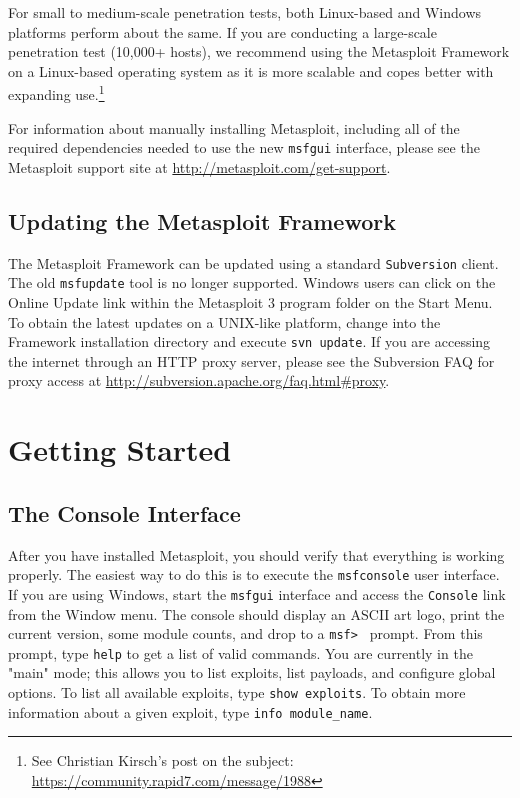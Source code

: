 \documentclass{report}
\begin{document}
\par
For small to medium-scale penetration tests, both Linux-based and Windows
platforms perform about the same. If you are conducting a large-scale
penetration test (10,000+ hosts), we recommend using the Metasploit Framework
on a Linux-based operating system as it is more scalable and copes better with
expanding use.\footnote{See Christian Kirsch's post on the subject:
\url{https://community.rapid7.com/message/1988}}

\par
For information about manually installing Metasploit, including all of the
required dependencies needed to use the new \texttt{msfgui} interface, please
see the Metasploit support site at \url{http://metasploit.com/get-support}.

    \section{Updating the Metasploit Framework}
    \label{INSTALL-UPDATE}

\par
The Metasploit Framework can be updated using a standard \texttt{Subversion}
client. The old \texttt{msfupdate} tool is no longer supported. Windows users
can click on the Online Update link within the Metasploit 3 program folder on
the Start Menu. To obtain the latest updates on a UNIX-like platform, change
into the Framework installation directory and execute \texttt{svn update}. If
you are accessing the internet through an HTTP proxy server, please see the
Subversion FAQ for proxy access at
\url{http://subversion.apache.org/faq.html#proxy}.

\pagebreak

\chapter{Getting Started}

    \section{The Console Interface}
    \label{STARTED-CONSOLE}

\par
After you have installed Metasploit, you should verify that everything is
working properly. The easiest way to do this is to execute the
\texttt{msfconsole} user interface. If you are using Windows, start the
\texttt{msfgui} interface and access the \texttt{Console} link from the Window
menu. The console should display an ASCII art logo, print the current version,
some module counts, and drop to a \texttt{msf> } prompt. From this prompt, type
\texttt{help} to get a list of valid commands. You are currently in the "main"
mode; this allows you to list exploits, list payloads, and configure global
options. To list all available exploits, type \texttt{show exploits}. To obtain
more information about a given exploit, type \texttt{info module\_name}.
\end{document}

